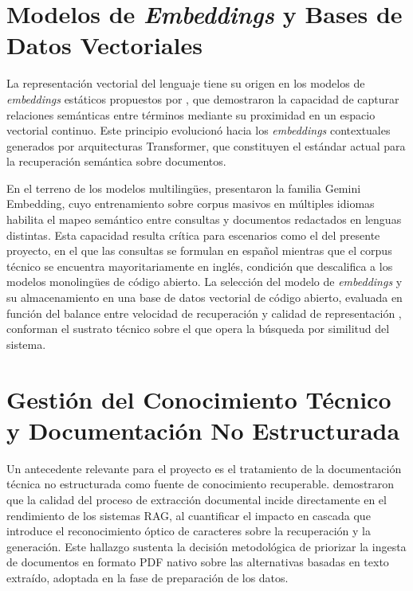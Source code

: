 {{\section{Modelos de \textit{Embeddings} y Bases de Datos Vectoriales}

La representación vectorial del lenguaje tiene su origen en los modelos de \textit{embeddings} estáticos propuestos por \textcite{mikolov2013efficient}, que demostraron la capacidad de capturar relaciones semánticas entre términos mediante su proximidad en un espacio vectorial continuo. Este principio evolucionó hacia los \textit{embeddings} contextuales generados por arquitecturas Transformer, que constituyen el estándar actual para la recuperación semántica sobre documentos.

En el terreno de los modelos multilingües, \textcite{lee2025gemini} presentaron la familia Gemini Embedding, cuyo entrenamiento sobre corpus masivos en múltiples idiomas habilita el mapeo semántico entre consultas y documentos redactados en lenguas distintas. Esta capacidad resulta crítica para escenarios como el del presente proyecto, en el que las consultas se formulan en español mientras que el corpus técnico se encuentra mayoritariamente en inglés, condición que descalifica a los modelos monolingües de código abierto. La selección del modelo de \textit{embeddings} y su almacenamiento en una base de datos vectorial de código abierto, evaluada en función del balance entre velocidad de recuperación y calidad de representación \parencite{ammar2025optimizing}, conforman el sustrato técnico sobre el que opera la búsqueda por similitud del sistema.

\section{Gestión del Conocimiento Técnico y Documentación No Estructurada}

Un antecedente relevante para el proyecto es el tratamiento de la documentación técnica no estructurada como fuente de conocimiento recuperable. \textcite{zhang2024ocr} demostraron que la calidad del proceso de extracción documental incide directamente en el rendimiento de los sistemas RAG, al cuantificar el impacto en cascada que introduce el reconocimiento óptico de caracteres sobre la recuperación y la generación. Este hallazgo sustenta la decisión metodológica de priorizar la ingesta de documentos en formato PDF nativo sobre las alternativas basadas en texto extraído, adoptada en la fase de preparación de los datos.

}}
